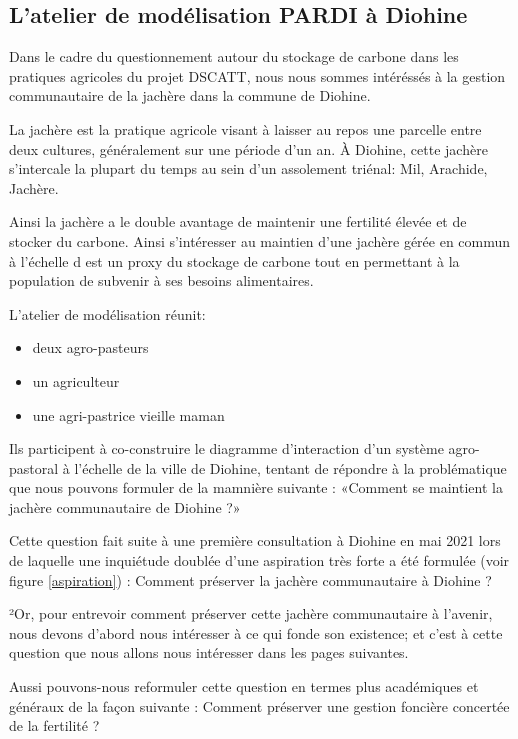 \subsection{L'atelier de modélisation PARDI à Diohine }

Dans le cadre du questionnement autour du stockage de carbone dans les pratiques agricoles du projet DSCATT, nous nous sommes intéréssés à la gestion communautaire de la jachère dans la commune de Diohine.

La jachère est la pratique agricole visant à laisser au repos une parcelle entre deux cultures, généralement sur une période d'un an. À Diohine, cette jachère s'intercale la plupart du temps au sein d'un assolement triénal: Mil, Arachide, Jachère.

Ainsi la jachère a le double avantage de maintenir une fertilité élevée et de stocker du carbone. Ainsi s'intéresser au maintien d'une jachère gérée en commun à l'échelle d est un proxy du stockage de carbone tout en permettant à la population de subvenir à ses besoins alimentaires.

L'atelier de modélisation réunit:
\begin{itemize}
  \item deux agro-pasteurs
  \item un agriculteur
  \item une agri-pastrice vieille maman
\end{itemize}

Ils participent à co-construire le diagramme d'interaction d'un système agro-pastoral à l'échelle de la ville de Diohine, tentant de répondre à la problématique que nous pouvons formuler de la mamnière suivante : «Comment se maintient la jachère communautaire de Diohine ?»

Cette question fait suite à une première consultation à Diohine en mai 2021 lors de laquelle une inquiétude doublée d'une aspiration très forte a été formulée (voir figure \ref{aspiration}) : Comment préserver la jachère communautaire à Diohine ?\cite{perrotton_definition_2021}

²Or, pour entrevoir comment préserver cette jachère communautaire à l'avenir, nous devons d'abord nous intéresser à ce qui fonde son existence; et c'est à cette question que nous allons nous intéresser dans les pages suivantes.


Aussi pouvons-nous reformuler cette question en termes plus académiques et généraux de la façon suivante :
Comment préserver une gestion foncière concertée de la fertilité ?

